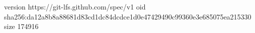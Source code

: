 version https://git-lfs.github.com/spec/v1
oid sha256:da12a8b8a88681d83cd1dc84dcdce1d0e47429490c99360e3e685075ea215330
size 174916
